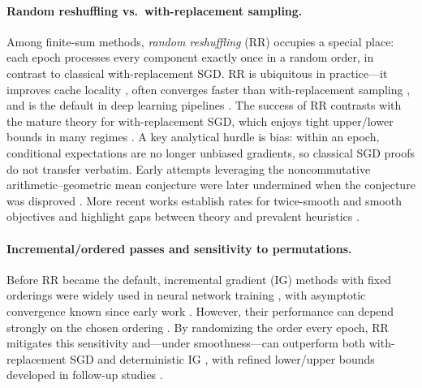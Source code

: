 \paragraph{Random reshuffling vs.\ with-replacement sampling.}
Among finite-sum methods, \emph{random reshuffling} (RR) occupies a special place: each epoch processes every component exactly once in a random order, in contrast to classical with-replacement SGD. RR is ubiquitous in practice---it improves cache locality \citep{Bengio2012}, often converges faster than with-replacement sampling \citep{Bottou2009,Recht2013}, and is the default in deep learning pipelines \citep{Sun2020}. The success of RR contrasts with the mature theory for with-replacement SGD, which enjoys tight upper/lower bounds in many regimes \citep{Rakhlin2012,Drori2019,HaNguyen2019}. A key analytical hurdle is bias: within an epoch, conditional expectations are no longer unbiased gradients, so classical SGD proofs do not transfer verbatim. Early attempts leveraging the noncommutative arithmetic--geometric mean conjecture \citep{RR-conjecture2012} were later undermined when the conjecture was disproved \citep{Recht-Re_conj_is_false_ICML_2020}. More recent works establish rates for twice-smooth and smooth objectives and highlight gaps between theory and prevalent heuristics \citep{Gurbuzbalaban2019RR,haochen2018random,Nagaraj2019,Safran2020good,Rajput2020}.

\paragraph{Incremental/ordered passes and sensitivity to permutations.}
Before RR became the default, incremental gradient (IG) methods with fixed orderings were widely used in neural network training \citep{Luo1991,Grippo1994}, with asymptotic convergence known since early work \citep{Mangasarian1994,Bertsekas2000}. However, their performance can depend strongly on the chosen ordering \citep{Nedic2001,Bertsekas2011}. By randomizing the order every epoch, RR mitigates this sensitivity and—under smoothness—can outperform both with-replacement SGD and deterministic IG \citep{Gurbuzbalaban2019RR,haochen2018random}, with refined lower/upper bounds developed in follow-up studies \citep{Nagaraj2019,Safran2020good,Rajput2020}.

